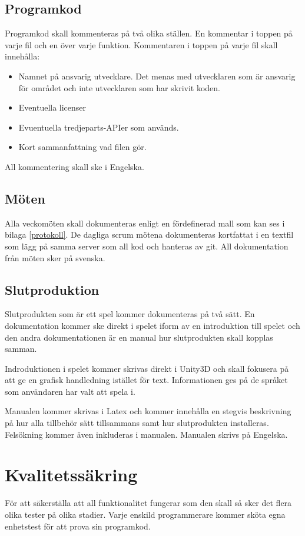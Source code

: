 \documentclass[a4paper,12pt,oneside,final]{extbook}
\begin{document}
\subsection{Programkod}
Programkod skall kommenteras på två olika ställen. En kommentar i toppen på varje fil och en över varje funktion. Kommentaren i toppen på varje fil skall innehålla:
\begin{itemize}
	\item Namnet på ansvarig utvecklare. Det menas med utvecklaren som är ansvarig för området och inte utvecklaren som har skrivit koden.
	\item Eventuella licenser
	\item Evuentuella tredjeparts-APIer som används.
	\item Kort sammanfattning vad filen gör.
\end{itemize}
All kommentering skall ske i Engelska.
\subsection{Möten}
Alla veckomöten skall dokumenteras enligt en fördefinerad mall som kan ses i bilaga \ref{protokoll}. De dagliga scrum mötena dokumenteras kortfattat i en textfil som lägg på samma server som all kod och hanteras av git. All dokumentation från möten sker på svenska.
\subsection{Slutproduktion}
Slutprodukten som är ett spel kommer dokumenteras på två sätt. En dokumentation kommer ske direkt i spelet iform av en introduktion till spelet och den andra dokumentationen är en manual hur slutprodukten skall kopplas samman. 

Indroduktionen i spelet kommer skrivas direkt i Unity3D och skall fokusera på att ge en grafisk handledning istället för text. Informationen ges på de språket som användaren har valt att spela i.

Manualen kommer skrivas i Latex och kommer innehålla en stegvis beskrivning på hur alla tillbehör sätt tillsammans samt hur slutprodukten installeras. Felsökning kommer även inkluderas i manualen. Manualen skrivs på Engelska.

\section{Kvalitetssäkring}
För att säkerställa att all funktionalitet fungerar som den skall så sker det flera olika tester på olika stadier. Varje enskild programmerare kommer sköta egna enhetstest för att prova sin programkod. 
\end{document}
